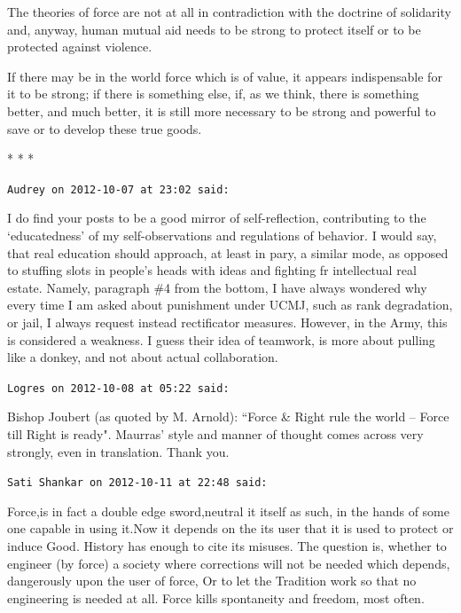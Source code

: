 The theories of force are not at all in contradiction with the doctrine of solidarity and, anyway, human mutual aid needs to be strong to protect itself or to be protected against violence.

If there may be in the world force which is of value, it appears indispensable for it to be strong; if there is something else, if, as we think, there is something better, and much better, it is still more necessary to be strong and powerful to save or to develop these true goods.




\begin{center}* * *\end{center}

\begin{footnotesize}\begin{sffamily}



\texttt{Audrey on 2012-10-07 at 23:02 said: }

I do find your posts to be a good mirror of self-reflection, contributing to the `educatedness' of my self-observations and regulations of behavior. I would say, that real education should approach, at least in pary, a similar mode, as opposed to stuffing slots in people's heads with ideas and fighting fr intellectual real estate. Namely, paragraph \#4 from the bottom, I have always wondered why every time I am asked about punishment under UCMJ, such as rank degradation, or jail, I always request instead rectificator measures. However, in the Army, this is considered a weakness. I guess their idea of teamwork, is more about pulling like a donkey, and not about actual collaboration.


\hfill

\texttt{Logres on 2012-10-08 at 05:22 said: }

Bishop Joubert (as quoted by M. Arnold): ``Force \& Right rule the world – Force till Right is ready". Maurras' style and manner of thought comes across very strongly, even in translation. Thank you.


\hfill

\texttt{Sati Shankar on 2012-10-11 at 22:48 said: }

Force,is in fact a double edge sword,neutral it itself as such, in the hands of some one capable in using it.Now it depends on the its user that it is used to protect or induce Good. History has enough to cite its misuses. The question is, whether to engineer (by force) a society where corrections will not be needed which depends, dangerously upon the user of force, Or to let the Tradition work so that no engineering is needed at all. Force kills spontaneity and freedom, most often.


\end{sffamily}
\end{footnotesize}
